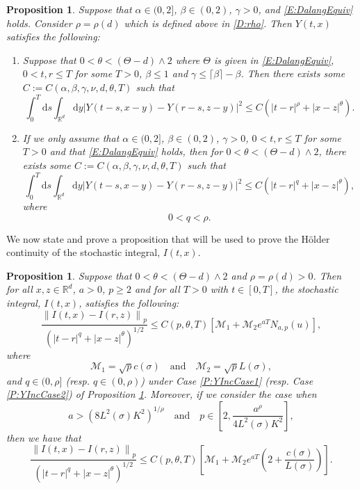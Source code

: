 \documentclass[a4paper,11pt]{article}
\numberwithin{equation}{section}
\theoremstyle{plain}
\newtheorem{proposition}[theorem]{Proposition}
\theoremstyle{definition}
\newcommand{\ud}{\ensuremath{\mathrm{d} }}
\newcommand{\Norm}[1]{\left\|  #1   \right\|}
\newcommand{\R}{\mathbb{R}}
\numberwithin{NQ}{section}
\numberwithin{LQ}{section}
\numberwithin{ZQ}{section}
\begin{document}
	\begin{proposition}{\normalfont\cite[Propositions 2.1 and 2.2]{chen.hu:21:holder}}
		\label{P:YInc}
		Suppose that $\alpha \in (0,2]$, $\beta \in (0,2)$, $\gamma>0$, and \eqref{E:DalangEquiv} holds. Consider $\rho = \rho(d)$ which is defined above in \eqref{D:rho}. Then $Y(t,x)$ satisfies the following:
		\begin{enumerate}
			\item \label{P:YIncCase1}  Suppose that $0< \theta < (\Theta -d) \wedge 2$ where $\Theta$ is given in \eqref{E:DalangEquiv}, $0< t,r \le T$ for some $T>0$, $\beta \le 1$ and $\gamma \le \lceil \beta \rceil - \beta$. Then there exists some $C := C(\alpha, \beta, \gamma, \nu, d, \theta, T)$ such that
			\[
			\int_0^T \ud s \int_{\R^d} \ud y |Y(t-s,x-y) - Y(r-s,z-y)|^2 \le C \left(|t-r|^\rho + |x-z|^{\theta}\right).
			\]
			\item \label{P:YIncCase2} If we only assume that $\alpha \in (0,2]$, $\beta \in (0,2)$, $\gamma>0$, $0< t,r \le T$ for some $T>0$ and that \eqref{E:DalangEquiv} holds, then for $0< \theta < (\Theta -d) \wedge 2$, there exists some $C := C(\alpha, \beta, \gamma, \nu, d, \theta, T)$ such that
			\[
			\int_0^T \ud s \int_{\R^d} \ud y |Y(t-s,x-y) - Y(r-s,z-y)|^2 \le C \left(|t-r|^q + |x-z|^{\theta}\right),
			\]
			where
			\[
			0 < q < \rho.
			\]
		\end{enumerate}
	\end{proposition}

We now state and prove a proposition that will be used to prove the H\"older continuity of the stochastic integral, $I(t,x)$.

	\begin{proposition}
		\label{P:NormInc}
		Suppose that $0< \theta < (\Theta -d) \wedge 2$ and $\rho = \rho(d) > 0$. Then for all $x,z \in \R^d$, $a>0$, $p\ge 2$ and for all $T>0$ with $t\in [0,T]$, the stochastic integral, $I(t,x)$, satisfies the following:
		\begin{equation}
		\label{E:NormInc_N(u)}
		\frac{\Norm{I(t,x)-I(r,z)}_p}{\left(|t-r|^{q} + |x-z|^{\theta}\right)^{1/2}} \le 	C(p,\theta, T)\left[ \mathcal{M}_1 + \mathcal{M}_2 e^{aT} N_{a,p}(u)\right] ,
		\end{equation}
		where
		\[
		\mathcal{M}_1 = \sqrt{p}c(\sigma) \quad \text{and} \quad\mathcal{M}_2 =\sqrt{p}L(\sigma),
		\]
		and $q \in (0, \rho]$ (resp. $q \in (0, \rho)$) under Case \ref{P:YIncCase1} (resp. Case \ref{P:YIncCase2}) of Proposition \ref{P:YInc}. Moreover, if we consider the case when
		\[
		a > \left( 8 L^2(\sigma)K^2\right)^{1/
			\rho}
\quad \text{and} \quad
		p \in \left[ 2, \frac{a^{\rho}}{4L^2(\sigma)K^2} \right],
		\]
		then we have that
		\begin{equation}
		\label{E:NormInc_cL}
		\frac{\Norm{I(t,x)-I(r,z)}_p}{\left(|t-r|^{q} + |x-z|^{\theta}\right)^{1/2}} \le C(p,\theta, T)\left[ \mathcal{M}_1 + \mathcal{M}_2 e^{aT} \left( 2 +  \frac{c(\sigma)}{L(\sigma)} \right)\right].
		\end{equation}
	\end{proposition}
\end{document}
